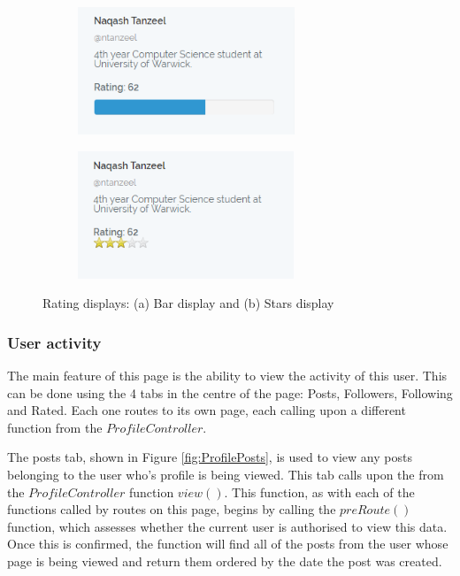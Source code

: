 \begin{figure}[H]
\centering
\begin{subfigure}[b]{.4\linewidth}
	\includegraphics[height=1.5in]{Images/Implementation/RatingBar}
	\caption{}
	\label{fig:RatingBar}
\end{subfigure}
\begin{subfigure}[b]{.5\linewidth}
	\centering
	\includegraphics[height=1.5in]{Images/Implementation/RatingStars}
	\caption{}
	\label{fig:RatingStars}
\end{subfigure}
\caption{Rating displays: (a) Bar display and (b) Stars display}
\label{fig:ReputationRatings}
\end{figure}

\subsubsection{User activity}
The main feature of this page is the ability to view the activity of this user. This can be done using the 4 tabs in the centre of the page: Posts, Followers, Following and Rated. Each one routes to its own page, each calling upon a different function from the \(ProfileController\).

The posts tab, shown in Figure \ref{fig:ProfilePosts}, is used to view any posts belonging to the user who's profile is being viewed. This tab calls upon the from the \(ProfileController\) function \(view()\). This function, as with each of the functions called by routes on this page, begins by calling the \(preRoute()\) function, which assesses whether the current user is authorised to view this data. Once this is confirmed, the function will find all of the posts from the user whose page is being viewed and return them ordered by the date the post was created.

